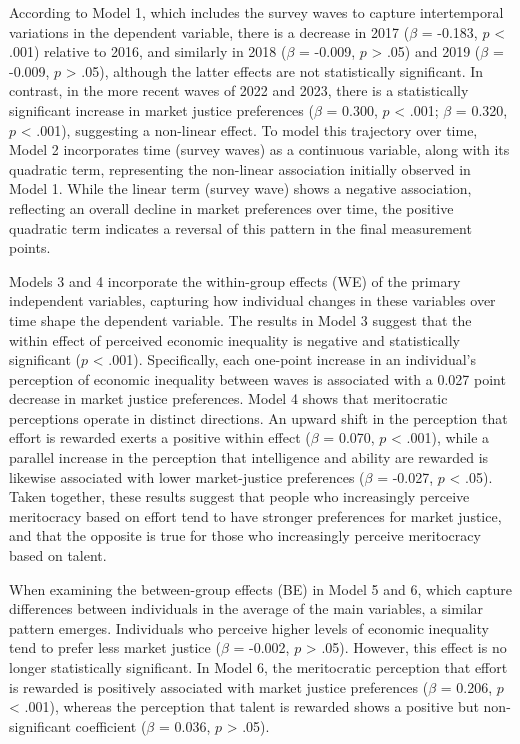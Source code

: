 \documentclass[
  12pt,
]{article}
\begin{document}
According to Model 1, which includes the survey waves to capture
intertemporal variations in the dependent variable, there is a decrease
in 2017 (\(\beta\) = -0.183, \(p\) \textless{} .001) relative to 2016,
and similarly in 2018 (\(\beta\) = -0.009, \(p\) \textgreater{} .05) and
2019 (\(\beta\) = -0.009, \(p\) \textgreater{} .05), although the latter
effects are not statistically significant. In contrast, in the more
recent waves of 2022 and 2023, there is a statistically significant
increase in market justice preferences (\(\beta\) = 0.300, \(p\)
\textless{} .001; \(\beta\) = 0.320, \(p\) \textless{} .001), suggesting
a non-linear effect. To model this trajectory over time, Model 2
incorporates time (survey waves) as a continuous variable, along with
its quadratic term, representing the non-linear association initially
observed in Model 1. While the linear term (survey wave) shows a
negative association, reflecting an overall decline in market
preferences over time, the positive quadratic term indicates a reversal
of this pattern in the final measurement points.

Models 3 and 4 incorporate the within-group effects (WE) of the primary
independent variables, capturing how individual changes in these
variables over time shape the dependent variable. The results in Model 3
suggest that the within effect of perceived economic inequality is
negative and statistically significant (\(p\) \textless{} .001).
Specifically, each one-point increase in an individual's perception of
economic inequality between waves is associated with a 0.027 point
decrease in market justice preferences. Model 4 shows that meritocratic
perceptions operate in distinct directions. An upward shift in the
perception that effort is rewarded exerts a positive within effect
(\(\beta\) = 0.070, \(p\) \textless{} .001), while a parallel increase
in the perception that intelligence and ability are rewarded is likewise
associated with lower market-justice preferences (\(\beta\) = -0.027,
\(p\) \textless{} .05). Taken together, these results suggest that
people who increasingly perceive meritocracy based on effort tend to
have stronger preferences for market justice, and that the opposite is
true for those who increasingly perceive meritocracy based on talent.

When examining the between-group effects (BE) in Model 5 and 6, which
capture differences between individuals in the average of the main
variables, a similar pattern emerges. Individuals who perceive higher
levels of economic inequality tend to prefer less market justice
(\(\beta\) = -0.002, \(p\) \textgreater{} .05). However, this effect is
no longer statistically significant. In Model 6, the meritocratic
perception that effort is rewarded is positively associated with market
justice preferences (\(\beta\) = 0.206, \(p\) \textless{} .001), whereas
the perception that talent is rewarded shows a positive but
non-significant coefficient (\(\beta\) = 0.036, \(p\) \textgreater{}
.05).
\end{document}
